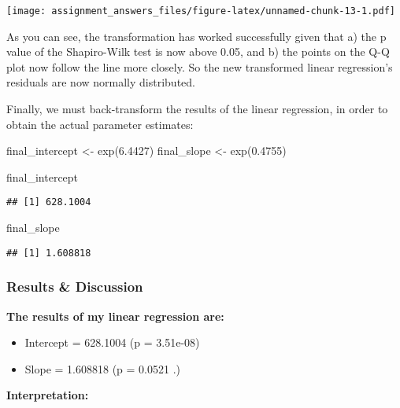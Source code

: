 \documentclass[
]{article}
\newenvironment{Shaded}{\begin{snugshade}}{\end{snugshade}}
\newcommand{\FloatTok}[1]{\textcolor[rgb]{0.00,0.00,0.81}{#1}}
\newcommand{\FunctionTok}[1]{\textcolor[rgb]{0.00,0.00,0.00}{#1}}
\newcommand{\NormalTok}[1]{#1}
\newcommand{\OtherTok}[1]{\textcolor[rgb]{0.56,0.35,0.01}{#1}}
\providecommand{\tightlist}{%
  \setlength{\itemsep}{0pt}\setlength{\parskip}{0pt}}
\begin{document}
\texttt{[image: assignment\_answers\_files/figure-latex/unnamed-chunk-13-1.pdf]}

As you can see, the transformation has worked successfully given that a)
the p value of the Shapiro-Wilk test is now above 0.05, and b) the
points on the Q-Q plot now follow the line more closely. So the new
transformed linear regression's residuals are now normally distributed.

Finally, we must back-transform the results of the linear regression, in
order to obtain the actual parameter estimates:

\begin{Shaded}
\begin{Highlighting}[]
\NormalTok{final\_intercept }\OtherTok{\textless{}{-}} \FunctionTok{exp}\NormalTok{(}\FloatTok{6.4427}\NormalTok{) }
\NormalTok{final\_slope }\OtherTok{\textless{}{-}} \FunctionTok{exp}\NormalTok{(}\FloatTok{0.4755}\NormalTok{) }

\NormalTok{final\_intercept}
\end{Highlighting}
\end{Shaded}

\begin{verbatim}
## [1] 628.1004
\end{verbatim}

\begin{Shaded}
\begin{Highlighting}[]
\NormalTok{final\_slope}
\end{Highlighting}
\end{Shaded}

\begin{verbatim}
## [1] 1.608818
\end{verbatim}

\hypertarget{results-discussion}{%
\subsubsection{Results \& Discussion}\label{results-discussion}}

\textbf{The results of my linear regression are:}

\begin{itemize}
\tightlist
\item
  Intercept = 628.1004 (p = 3.51e-08)
\item
  Slope = 1.608818 (p = 0.0521 .)
\end{itemize}

\textbf{Interpretation:}
\end{document}
